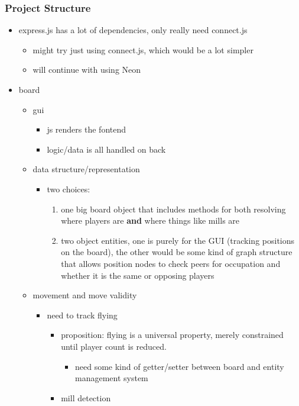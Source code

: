 \documentclass[11pt]{article}
\begin{document}
\subsubsection*{Project Structure}
\label{sec:org2802c93}
\begin{itemize}
\item express.js has a lot of dependencies, only really need connect.js
\begin{itemize}
\item might try just using connect.js, which would be a lot simpler
\item will continue with using Neon
\end{itemize}
\item board
\begin{itemize}
\item gui
\begin{itemize}
\item js renders the fontend
\item logic/data is all handled on back
\end{itemize}
\item data structure/representation
\begin{itemize}
\item two choices:
\begin{enumerate}
\item one big board object that includes methods for both resolving where players are \textbf{and}
where things like mills are
\item two object entities, one is purely for the GUI (tracking positions on the board), the
other would be some kind of graph structure that allows position nodes to check peers
for occupation and whether it is the same or opposing players
\end{enumerate}
\end{itemize}
\item movement and move validity
\begin{itemize}
\item need to track flying
\begin{itemize}
\item proposition: flying is a universal property, merely constrained until player count is
reduced.
\begin{itemize}
\item need some kind of getter/setter between board and entity management system
\end{itemize}
\item mill detection
\begin{itemize}

\end{itemize}
\end{itemize}
\end{itemize}
\end{itemize}
\end{itemize}
\end{document}
